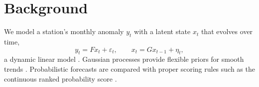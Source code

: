 \chapter{Background}
\label{ch:background}

We model a station's monthly anomaly $y_t$ with a latent state $x_t$ that evolves over time,
\begin{equation}
  y_t = F x_t + \varepsilon_t, \qquad x_t = G x_{t-1} + \eta_t ,
  \label{eq:ssm}
\end{equation}
a dynamic linear model \citep{west1997}. Gaussian processes provide flexible priors for smooth
trends \citep{rasmussen2006gp}. Probabilistic forecasts are compared with proper scoring
rules such as the continuous ranked probability score \citep{gneiting2007}.

